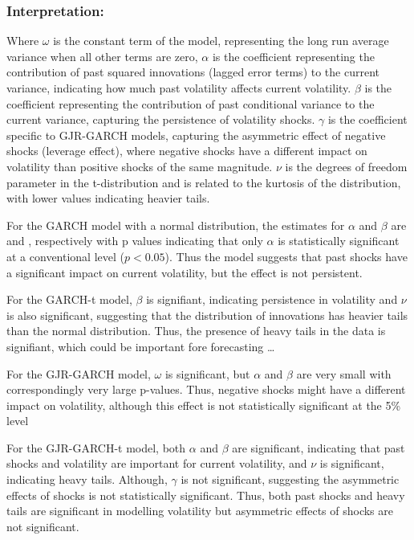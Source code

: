 \documentclass{article}
\begin{document}
\subsubsection*{Interpretation:}

Where $\omega$ is the constant term of the model, representing the long run average variance when all other terms are zero, 
 $\alpha$ is the coefficient representing the contribution of past squared innovations (lagged error terms) to the current variance, indicating how much past volatility affects current volatility. 
  $\beta$ is the coefficient representing the contribution of past conditional variance to the current variance, capturing the persistence of volatility shocks. 
  $\gamma$ is the coefficient specific to GJR-GARCH models, capturing the asymmetric effect of negative shocks (leverage effect), where negative shocks have a different impact on volatility than positive shocks of the same magnitude. 
  $\nu$ is the degrees of freedom parameter in the t-distribution and is related to the kurtosis of the distribution, with lower values indicating heavier tails. 

For the GARCH model with a normal distribution, the estimates for $\alpha$ and $\beta$ are \bw and \bb, respectively with p values indicating that only $\alpha$ is statistically significant at a conventional level ($p < 0.05$). Thus the model suggests that past shocks have a significant impact on current volatility, but the effect is not persistent. 

For the GARCH-t model, $\beta$ is signifiant, indicating persistence in volatility and $\nu$ is also significant, suggesting that the distribution of innovations has heavier tails than the normal distribution. 
Thus, the presence of heavy tails in the data is signifiant, which could be important fore forecasting \ldots

For the GJR-GARCH model, $\omega$ is significant, but $\alpha$ and $\beta$ are very small with correspondingly very large p-values. 
Thus, negative shocks might have a different impact on volatility, although this effect is not statistically significant at the 5\% level

For the GJR-GARCH-t model, both $\alpha$ and $\beta$ are significant, indicating that past shocks and volatility are important for current volatility, and $\nu$ is significant, indicating heavy tails. 
Although, $\gamma$ is not significant, suggesting the asymmetric effects of shocks is not statistically significant. 
Thus, both past shocks and heavy tails are significant in modelling volatility but asymmetric effects of shocks are not significant. 
\end{document}
